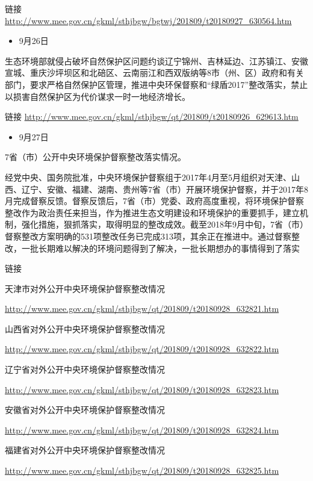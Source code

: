 \documentclass[
]{book}
\providecommand{\tightlist}{%
  \setlength{\itemsep}{0pt}\setlength{\parskip}{0pt}}
\begin{document}
链接 \url{http://www.mee.gov.cn/gkml/sthjbgw/bgtwj/201809/t20180927_630564.htm}

\begin{itemize}
\tightlist
\item
  9月26日
\end{itemize}

生态环境部就侵占破坏自然保护区问题约谈辽宁锦州、吉林延边、江苏镇江、安徽宣城、重庆沙坪坝区和北碚区、云南丽江和西双版纳等8市（州、区）政府和有关部门，要求严格自然保护区管理，推进中央环保督察和``绿盾2017''整改落实，禁止以损害自然保护区为代价谋求一时一地经济增长。

链接 \url{http://www.mee.gov.cn/gkml/sthjbgw/qt/201809/t20180926_629613.htm}

\begin{itemize}
\tightlist
\item
  9月27日
\end{itemize}

7省（市）公开中央环境保护督察整改落实情况。

经党中央、国务院批准，中央环境保护督察组于2017年4月至5月组织对天津、山西、辽宁、安徽、福建、湖南、贵州等7省（市）开展环境保护督察，并于2017年8月完成督察反馈。督察反馈后，7省（市）党委、政府高度重视，将环境保护督察整改作为政治责任来担当，作为推进生态文明建设和环境保护的重要抓手，建立机制，强化措施，狠抓落实，取得明显的整改成效。截至2018年9月中旬，7省（市）督察整改方案明确的531项整改任务已完成313项，其余正在推进中。通过督察整改，一批长期难以解决的环境问题得到了解决，一批长期想办的事情得到了落实

链接

天津市对外公开中央环境保护督察整改情况

\url{http://www.mee.gov.cn/gkml/sthjbgw/qt/201809/t20180928_632821.htm}

山西省对外公开中央环境保护督察整改情况

\url{http://www.mee.gov.cn/gkml/sthjbgw/qt/201809/t20180928_632822.htm}

辽宁省对外公开中央环境保护督察整改情况

\url{http://www.mee.gov.cn/gkml/sthjbgw/qt/201809/t20180928_632823.htm}

安徽省对外公开中央环境保护督察整改情况

\url{http://www.mee.gov.cn/gkml/sthjbgw/qt/201809/t20180928_632824.htm}

福建省对外公开中央环境保护督察整改情况

\url{http://www.mee.gov.cn/gkml/sthjbgw/qt/201809/t20180928_632825.htm}
\end{document}
